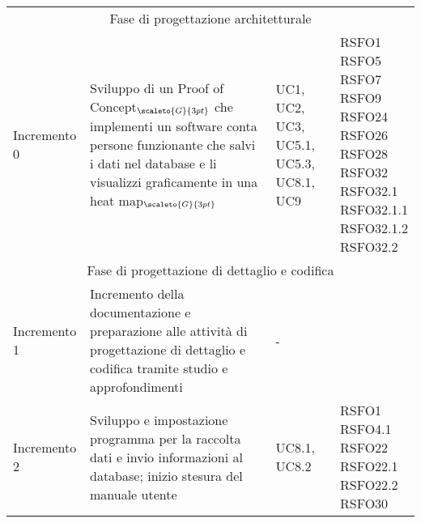 \begin{center}
	\renewcommand{\arraystretch}{1.4}
	\begin{longtable}[c]{p{3cm}|p{5cm}|p{4cm}|p{3cm}}
		\hline
		\rowcolor{airforceblue}
		\makecell[c]{\textbf{Incremento}} & \makecell[c]{\textbf{Obiettivi}} & \makecell[c]{\textbf{Casi d'uso}} &  \makecell[c]{\textbf{Requisiti}}\\
		\hline
		\multicolumn{4}{|c|}{Fase di progettazione architetturale}\\
		\hline
		\centering Incremento 0 & \centering Sviluppo di un
		Proof of Concept$_{\scaleto{G}{3pt}}$ che implementi un software conta persone funzionante che salvi i dati nel database e li visualizzi graficamente in una heat map$_{\scaleto{G}{3pt}}$ & \centering  UC1, UC2, UC3, UC5.1, UC5.3, UC8.1, UC9 & \makecell[tc]{RSFO1 \\ RSFO5 \\ RSFO7 \\ RSFO9 \\ RSFO24 \\ RSFO26 \\ RSFO28 \\ RSFO32 \\ RSFO32.1 \\ RSFO32.1.1 \\ RSFO32.1.2 \\ RSFO32.2} \\
		\hline
		\multicolumn{4}{|c|}{Fase di progettazione di dettaglio e codifica}\\
		\hline
		\centering Incremento 1 & \centering Incremento della documentazione e preparazione alle attività di progettazione di dettaglio e codifica tramite studio e approfondimenti & \centering - & \makecell[tc]{-} \\
		\hline
		\centering Incremento 2 & \centering Sviluppo e impostazione programma per la raccolta dati e invio informazioni al database; inizio stesura del manuale utente & \centering UC8.1, UC8.2 & \makecell[tc]{RSFO1 \\ RSFO4.1 \\ RSFO22 \\ RSFO22.1 \\ RSFO22.2 \\ RSFO30} \\
		\hline

\end{longtable}
\end{center}
